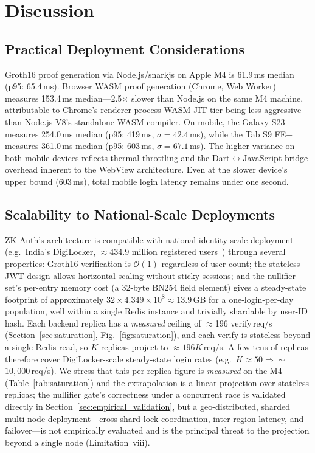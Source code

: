 \documentclass[journal,twoside,10pt]{IEEEtran}
\begin{document}
\section{Discussion}
\label{sec:discussion}

\subsection{Practical Deployment Considerations}
Groth16 proof generation via Node.js/snarkjs on Apple M4 is 61.9\,ms median
(p95: 65.4\,ms). Browser WASM proof generation (Chrome, Web Worker)
measures 153.4\,ms median---2.5$\times$ slower than Node.js on the same M4
machine, attributable to Chrome's renderer-process WASM JIT tier being
less aggressive than Node.js V8's standalone WASM compiler.
On mobile, the Galaxy S23 measures 254.0\,ms median (p95: 419\,ms,
$\sigma=42.4$\,ms), while the Tab S9 FE+ measures 361.0\,ms median (p95:
603\,ms, $\sigma=67.1$\,ms). The higher variance on both mobile devices
reflects thermal throttling and the Dart$\leftrightarrow$JavaScript bridge
overhead inherent to the WebView architecture. Even at the slower
device's upper bound (603\,ms), total mobile login latency remains under
one second.

\subsection{Scalability to National-Scale Deployments}
ZK-Auth's architecture is compatible with national-identity-scale
deployment (e.g.\ India's DigiLocker, $\approx$434.9 million registered
users~\cite{digilocker}) through several properties: Groth16 verification
is $\mathcal{O}(1)$ regardless of user count; the stateless JWT design
allows horizontal scaling without sticky sessions; and the nullifier set's
per-entry memory cost (a 32-byte BN254 field element) gives a steady-state
footprint of approximately
$32\times4.349\times10^8\approx13.9$\,GB for a one-login-per-day
population, well within a single Redis instance and trivially shardable
by user-ID hash. Each backend replica has a \emph{measured} ceiling of
$\approx$196 verify\,req/s (Section~\ref{sec:saturation},
Fig.~\ref{fig:saturation}), and each verify is stateless beyond a single
Redis read, so $K$ replicas project to $\approx$$196K$\,req/s. A few tens
of replicas therefore cover DigiLocker-scale steady-state login rates
(e.g.\ $K\approx50\Rightarrow\sim$$10{,}000$\,req/s). We stress that this
per-replica figure is \emph{measured} on the M4 (Table~\ref{tab:saturation})
and the extrapolation is a linear projection over stateless replicas; the
nullifier gate's correctness under a concurrent race is validated directly
in Section~\ref{sec:empirical_validation}, but a geo-distributed, sharded
multi-node deployment---cross-shard lock coordination, inter-region
latency, and failover---is not empirically evaluated and is the principal
threat to the projection beyond a single node (Limitation~viii).
\end{document}
